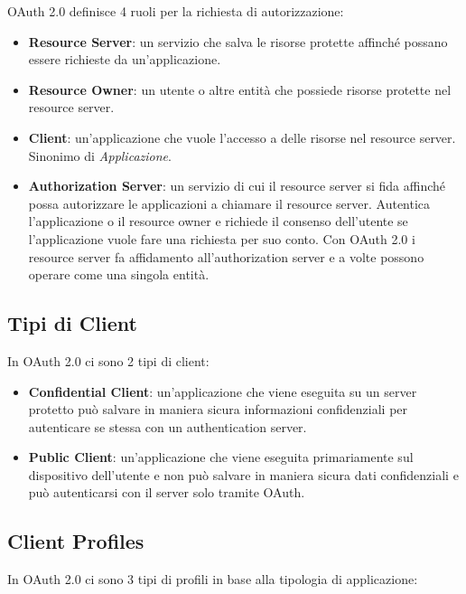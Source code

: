 OAuth 2.0 definisce 4 ruoli per la richiesta di autorizzazione:

\begin{itemize}
      \item \textbf{Resource Server}: un servizio che salva le risorse protette affinché
            possano essere richieste da un'applicazione.
      \item \textbf{Resource Owner}: un utente o altre entità che possiede risorse protette
            nel resource server.
      \item \textbf{Client}: un'applicazione che vuole l'accesso a delle risorse nel
            resource server. Sinonimo di \textit{Applicazione}.
      \item \textbf{Authorization Server}: un servizio di cui il resource server si fida
            affinché possa autorizzare le applicazioni a chiamare il resource server.
            Autentica l'applicazione o il resource owner e richiede il consenso dell'utente
            se l'applicazione
            vuole fare una richiesta per suo conto. Con OAuth 2.0 i resource server fa
            affidamento all'authorization server e a volte possono operare come una
            singola entità.
\end{itemize}

\subsection{Tipi di Client}

In OAuth 2.0 ci sono 2 tipi di client:

\begin{itemize}
      \item \textbf{Confidential Client}: un'applicazione che viene eseguita su un server
            protetto può salvare in maniera sicura informazioni confidenziali per
            autenticare se stessa con un authentication server.
      \item \textbf{Public Client}: un'applicazione che viene eseguita primariamente sul
            dispositivo dell'utente e non può salvare in maniera sicura dati confidenziali
            e può autenticarsi con il server solo tramite OAuth.
\end{itemize}

\subsection{Client Profiles}

In OAuth 2.0 ci sono 3 tipi di profili in base alla tipologia di applicazione:

